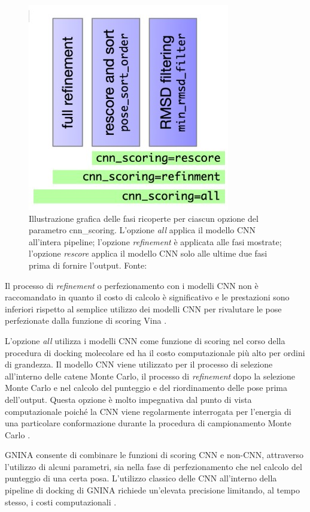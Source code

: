 \begin{figure}[H]
    \centering
    \includegraphics{images/cnn_scoring.jpg}
    \caption[Fasi ricoperte dalle opzioni per il parametro cnn\_scoring.]{Illustrazione grafica delle fasi ricoperte per ciascun opzione del parametro cnn\_scoring. L'opzione \textit{all} applica il modello CNN all'intera pipeline; l'opzione \textit{refinement} è applicata alle fasi mostrate; l'opzione \textit{rescore} applica il modello CNN solo alle ultime due fasi prima di fornire l'output. Fonte: \cite{mcnutt_gnina_2021}}
    \label{fig:cnn_scoring}
\end{figure}

Il processo di \textit{refinement} o perfezionamento con i modelli CNN non è raccomandato in quanto il costo di calcolo è significativo e le prestazioni sono inferiori rispetto al semplice utilizzo dei modelli CNN per rivalutare le pose perfezionate dalla funzione di scoring Vina \cite{mcnutt_gnina_2021}.

L'opzione \textit{all} utilizza i modelli CNN come funzione di scoring nel corso della procedura di docking molecolare ed ha il costo computazionale più alto per ordini di grandezza. Il modello CNN viene utilizzato per il processo di selezione all'interno delle catene Monte Carlo, il processo di \textit{refinement} dopo la selezione Monte Carlo e nel calcolo del punteggio e del riordinamento delle pose prima dell'output. 
Questa opzione è molto impegnativa dal punto di vista computazionale poiché la CNN viene regolarmente interrogata per l'energia di una particolare conformazione durante la procedura di campionamento Monte Carlo \cite{mcnutt_gnina_2021}. 

GNINA consente di combinare le funzioni di scoring CNN e non-CNN, attraverso l'utilizzo di alcuni parametri, sia nella fase di perfezionamento che nel calcolo del punteggio di una certa posa.
L'utilizzo classico delle CNN all'interno della pipeline di docking di GNINA richiede un'elevata precisione limitando, al tempo stesso, i costi computazionali \cite{mcnutt_gnina_2021}.


